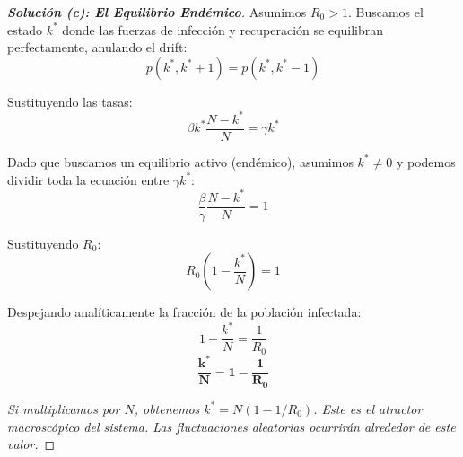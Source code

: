 \documentclass[10pt,a4paper]{article}
\begin{document}
\begin{proof}[\textbf{Solución (c): El Equilibrio Endémico}]
    Asumimos $R_0 > 1$. Buscamos el estado $k^*$ donde las fuerzas de infección y recuperación se equilibran perfectamente, anulando el drift:
    \[ p(k^*, k^*+1) = p(k^*, k^*-1) \]
    
    Sustituyendo las tasas:
    \[ \beta k^* \frac{N-k^*}{N} = \gamma k^* \]
    
    Dado que buscamos un equilibrio activo (endémico), asumimos $k^* \neq 0$ y podemos dividir toda la ecuación entre $\gamma k^*$:
    \[ \frac{\beta}{\gamma} \frac{N-k^*}{N} = 1 \]
    
    Sustituyendo $R_0$:
    \[ R_0 \left( 1 - \frac{k^*}{N} \right) = 1 \]
    
    Despejando analíticamente la fracción de la población infectada:
    \[ 1 - \frac{k^*}{N} = \frac{1}{R_0} \]
    \[ \mathbf{\frac{k^*}{N} = 1 - \frac{1}{R_0}} \]
    
    \textit{Si multiplicamos por $N$, obtenemos $k^* = N(1 - 1/R_0)$. Este es el atractor macroscópico del sistema. Las fluctuaciones aleatorias ocurrirán alrededor de este valor.}
\end{proof}

\vspace{5mm}
\end{document}
